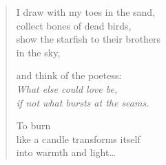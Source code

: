 \clearpage

\begin{verse}
I draw with my toes in the sand,\\
collect bones of dead birds,\\
show the starfish to their brothers\\
in the sky,

and think of the poetess:\\
{\itshape What else could love be,\\
if not what bursts at the seams.}

To burn\\
like a candle transforms itself\\
into warmth and light\ldots

\end{verse}
